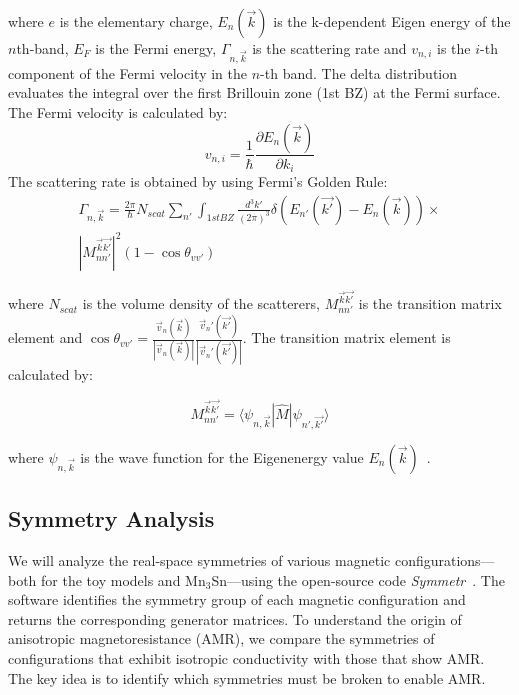 \documentclass[prb,showpacs,amsmath,amssymb,superscriptaddress,twocolumn,floatfix]{revtex4-1}
\begin{document}
where $e$ is the elementary charge, $E_n(\vec{k})$ is the k-dependent Eigen energy of the $n$th-band, $E_F$ is the Fermi energy, $\Gamma_{n, \vec{k}}$ is the scattering rate and $v_{n,i}$ is the $i$-th component of the Fermi velocity in the $n$-th band. The delta distribution evaluates the integral over the first Brillouin zone (1st BZ) at the Fermi surface. The Fermi velocity is calculated by:
%
\begin{equation}
	v_{n, i} = \frac{1}{\hbar} \frac{\partial E_n(\vec{k})}{\partial k_i}
\end{equation}
%
The scattering rate is obtained by using Fermi's Golden Rule:
%
\begin{multline}
	\Gamma_{n, \vec{k}} = \frac{2 \pi}{\hbar} N_{scat} \sum_{n'}  \int_ {1st BZ} \frac{d^3k'}{(2\pi)^3} \delta(E_{n'}(\vec{k'}) - E_n(\vec{k})) \times \\ |M^{\vec{k}\vec{k'}}_{nn'} |^2 (1 - \cos \theta_{vv'})
	\label{eq_FermiGoldenRule_1}
\end{multline}

where $N_{scat}$ is the volume density of the scatterers, $M^{\vec{k}\vec{k'}}_{nn'}$ is the transition matrix element and $\cos \theta_{vv'} = \frac{\vec{v}_n (\vec{k})}{|\vec{v}_n (\vec{k})|}\frac{\vec{v}_n' (\vec{k'})}{|\vec{v}_n' (\vec{k'})|}$. The transition matrix element is calculated by:

\begin{equation}
	M^{\vec{k}\vec{k'}}_{nn'} = \langle \psi_{n, \vec{k}}|\hat{M}|\psi_{n', \vec{k'}} \rangle
	\label{eq_transmatrix}
\end{equation}

where $\psi_{n, \vec{k}}$ is the wave function for the Eigenenergy value $E_n(\vec{k})$~\cite{Vyborny:2009}. 


\subsection{Symmetry Analysis}
We will analyze the real-space symmetries of various magnetic configurations—both for the toy models and Mn$_3$Sn—using the open-source code \textit{Symmetr}~\cite{Symmetr}. The software identifies the symmetry group of each magnetic configuration and returns the corresponding generator matrices. To understand the origin of anisotropic magnetoresistance (AMR), we compare the symmetries of configurations that exhibit isotropic conductivity with those that show AMR. The key idea is to identify which symmetries must be broken to enable AMR.
\end{document}
